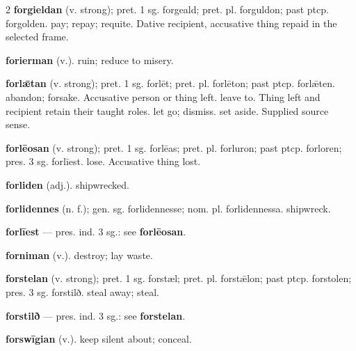 \begin{multicols*}{2}
\textbf{forgieldan} (v. strong); pret. 1 sg. forgeald; pret. pl. forguldon; past ptcp. forgolden. pay; repay; requite. Dative recipient, accusative thing repaid in the selected frame.\par
\textbf{forierman} (v.). ruin; reduce to misery.\par
\textbf{forlǣtan} (v. strong); pret. 1 sg. forlēt; pret. pl. forlēton; past ptcp. forlǣten. abandon; forsake. Accusative person or thing left. leave to. Thing left and recipient retain their taught roles. let go; dismiss. set aside. Supplied source sense.\par
\textbf{forlēosan} (v. strong); pret. 1 sg. forlēas; pret. pl. forluron; past ptcp. forloren; pres. 3 sg. forlīest. lose. Accusative thing lost.\par
\textbf{forliden} (adj.). shipwrecked.\par
\textbf{forlidennes} (n. f.); gen. sg. forlidennesse; nom. pl. forlidennessa. shipwreck.\par
\textbf{forlīest} — pres. ind. 3 sg.: see \textbf{forlēosan}.\par
\textbf{forniman} (v.). destroy; lay waste.\par
\textbf{forstelan} (v. strong); pret. 1 sg. forstæl; pret. pl. forstǣlon; past ptcp. forstolen; pres. 3 sg. forstilð. steal away; steal.\par
\textbf{forstilð} — pres. ind. 3 sg.: see \textbf{forstelan}.\par
\textbf{forswīgian} (v.). keep silent about; conceal.\par

\end{multicols*}
